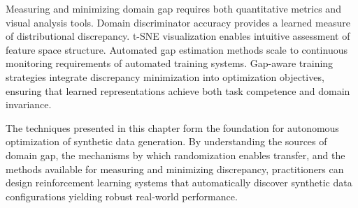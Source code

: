 Measuring and minimizing domain gap requires both quantitative metrics and visual analysis tools. Domain discriminator accuracy provides a learned measure of distributional discrepancy. t-SNE visualization enables intuitive assessment of feature space structure. Automated gap estimation methods scale to continuous monitoring requirements of automated training systems. Gap-aware training strategies integrate discrepancy minimization into optimization objectives, ensuring that learned representations achieve both task competence and domain invariance.

The techniques presented in this chapter form the foundation for autonomous optimization of synthetic data generation. By understanding the sources of domain gap, the mechanisms by which randomization enables transfer, and the methods available for measuring and minimizing discrepancy, practitioners can design reinforcement learning systems that automatically discover synthetic data configurations yielding robust real-world performance.
